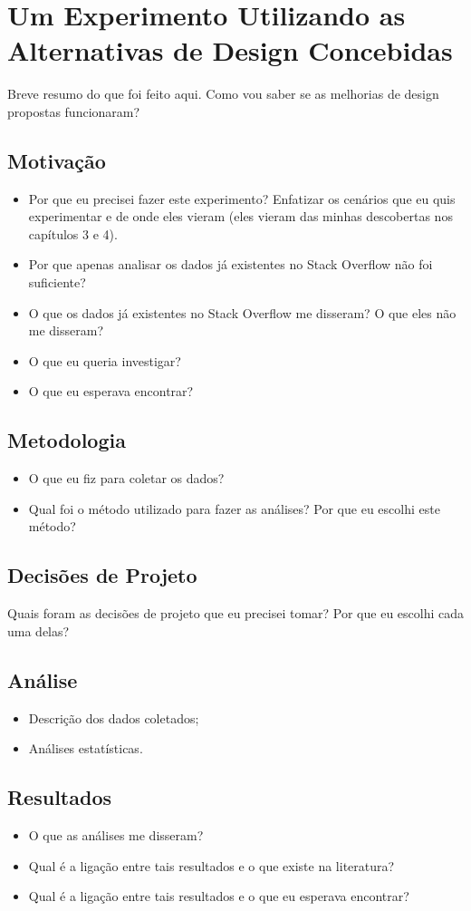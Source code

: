 \chapter{Um Experimento Utilizando as Alternativas de Design Concebidas}
Breve resumo do que foi feito aqui. Como vou saber se as melhorias de design propostas funcionaram?
\section{Motivação}
\begin{itemize}
\item Por que eu precisei fazer este experimento? Enfatizar os cenários que eu quis experimentar e de onde eles vieram (eles vieram das minhas descobertas nos capítulos 3 e 4).
\item Por que apenas analisar os dados já existentes no Stack Overflow não foi suficiente? 
\item O que os dados já existentes no Stack Overflow me disseram? O que eles não me disseram?
\item O que eu queria investigar?
\item O que eu esperava encontrar?
\end{itemize}
\section{Metodologia}
\begin{itemize}
\item O que eu fiz para coletar os dados?
\item Qual foi o método utilizado para fazer as análises? Por que eu escolhi este método?
\end{itemize}
\section{Decisões de Projeto}
Quais foram as decisões de projeto que eu precisei tomar? Por que eu escolhi cada uma delas?
\section{Análise}
\begin{itemize}
\item Descrição dos dados coletados;
\item Análises estatísticas.
\end{itemize}
\section{Resultados}
\begin{itemize}
\item O que as análises me disseram?
\item Qual é a ligação entre tais resultados e o que existe na literatura?
\item Qual é a ligação entre tais resultados e o que eu esperava encontrar?
\end{itemize}